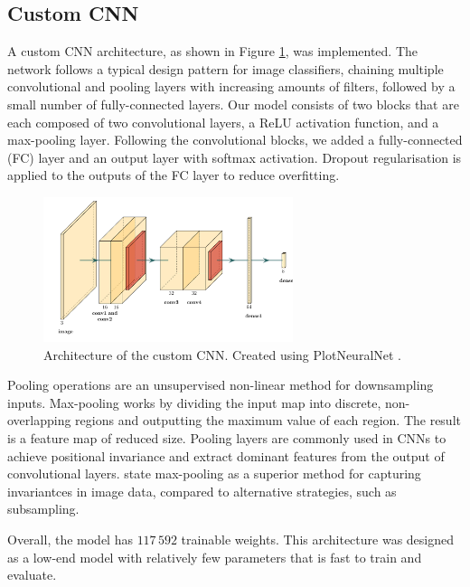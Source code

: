 \documentclass{l4proj}
\begin{document}
\subsection{Custom CNN}
\label{custom_cnn}

A custom CNN architecture, as shown in Figure \ref{fig:customnet}, was implemented. The network follows a typical design pattern for image classifiers, chaining multiple convolutional and pooling layers with increasing amounts of filters, followed by a small number of fully-connected layers. Our model consists of two blocks that are each composed of two convolutional layers, a ReLU activation function, and a max-pooling layer. Following the convolutional blocks, we added a fully-connected (FC) layer and an output layer with softmax activation. Dropout regularisation is applied to the outputs of the FC layer to reduce overfitting.

\begin{figure}[ht]
  \centering
  \includegraphics[width=0.65\textwidth]{images/models/customnet}
  \caption{Architecture of the custom CNN. Created using PlotNeuralNet \citep{iqbal_harisiqbal88plotneuralnet_2018}.}
  \label{fig:customnet}
\end{figure}

Pooling operations are an unsupervised non-linear method for downsampling inputs. Max-pooling works by dividing the input map into discrete, non-overlapping regions and outputting the maximum value of each region. The result is a feature map of reduced size. Pooling layers are commonly used in CNNs to achieve positional invariance and extract dominant features from the output of convolutional layers. \citet{scherer_evaluation_2010} state max-pooling as a superior method for capturing invariantces in image data, compared to alternative strategies, such as subsampling.

Overall, the model has $117\,592$ trainable weights. This architecture was designed as a low-end model with relatively few parameters that is fast to train and evaluate.
\end{document}
